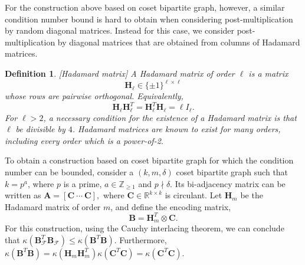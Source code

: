 \documentclass[journal,draftcls,onecolumn]{IEEEtran}
\theoremstyle{mystyle}
\newtheorem{defn}{Definition}
\newcommand{\bfC}{\mathbf{C}}
\newcommand{\bfH}{\mathbf{H}}
\newcommand{\bfB}{\mathbf{B}}
\newcommand{\aditya}[1]{\marginpar{+}{\bf Aditya's remark}: {\em #1}}
\begin{document}
For the construction above based on coset bipartite graph, however, a similar condition number bound is hard to obtain when considering post-multiplication by random diagonal matrices. Instead for this case, we consider post-multiplication by diagonal matrices that are obtained from columns of Hadamard matrices.

\begin{defn} {[{\it Hadamard matrix}]}
A Hadamard matrix of order $\ell$ is a matrix
\[
\mathbf{H}_\ell \in \{\pm 1\}^{\ell\times \ell}
\]
whose rows are pairwise orthogonal. Equivalently,
\[
\mathbf{H}_\ell \mathbf{H}_\ell^{T} = \mathbf{H}_\ell^{T} \mathbf{H}_\ell = \ell I_\ell.
\]    
For $\ell>2$, a necessary condition for the existence of a Hadamard matrix
is that $\ell$ be divisible by $4$. Hadamard matrices are known to exist for many
orders, including every order which is a power-of-2.
\end{defn}
To obtain a construction based on coset bipartite graph for which the condition number can be bounded, consider a $(k,m,\delta)$ coset bipartite graph such that $k = p^a$, where $p$ is a prime, $a \in \mathbb{Z}_{\ge 1}$ and $p \nmid \delta$. Its bi-adjacency matrix can be written as $\mathbf{A}=[\mathbf{C}\ \cdots\ \mathbf{C}],$ where $\mathbf{C}\in\mathbb{R}^{k\times k}$ is circulant. Let $\mathbf{H}_m$ be the Hadamard matrix of order $m$, and define the encoding matrix,%
\begin{equation} \label{eq:hada_coset_cons} \mathbf{B}=\mathbf{H}_m^T\otimes\mathbf{C}. \end{equation} 
For this construction, using the Cauchy interlacing theorem, we can conclude that $\kappa(\mathbf{B}_{\mathcal{F}}^T\mathbf{B}_{\mathcal{F}}) \le \kappa(\bfB^T\bfB)$. Furthermore, $\kappa(\bfB^T\bfB) = \kappa(\bfH_m\bfH^T_m) \kappa (\bfC^T\bfC) =  \kappa (\bfC^T\bfC)$.





\end{document}
